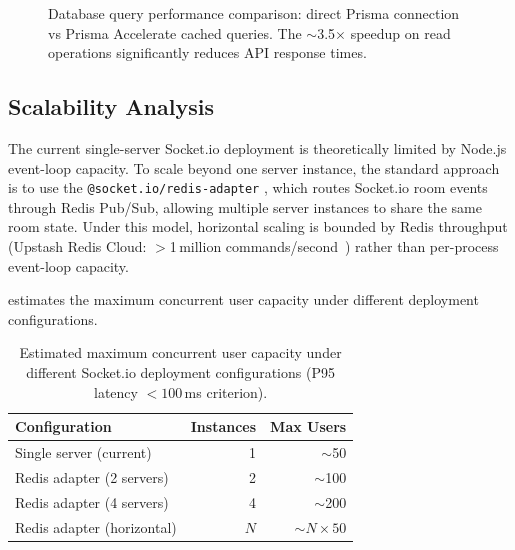 \begin{figure}[H]
  \centering
  \caption{Database query performance comparison: direct Prisma connection
    vs Prisma Accelerate cached queries. The $\sim$3.5$\times$ speedup
    on read operations significantly reduces API response times.}
  \label{fig:db_queries}
\end{figure}

\subsection{Scalability Analysis}

The current single-server Socket.io deployment is theoretically limited by
Node.js event-loop capacity. To scale beyond one server instance, the standard
approach is to use the \texttt{@socket.io/redis-adapter}
\cite{socketio2024adapter}, which routes Socket.io room events through Redis
Pub/Sub, allowing multiple server instances to share the same room state.
Under this model, horizontal scaling is bounded by Redis throughput
(Upstash Redis Cloud: $>$1\,million commands/second~\cite{upstash2024}) rather
than per-process event-loop capacity.

 estimates the maximum concurrent user capacity under
different deployment configurations.

\begin{table}[H]
  \centering
  \caption{Estimated maximum concurrent user capacity under different
    Socket.io deployment configurations (P95 latency $< 100$\,ms criterion).}
  \label{tab:scalability}
  \begin{tabular}{lrr}
    \toprule
    \textbf{Configuration}          & \textbf{Instances} & \textbf{Max Users} \\
    \midrule
    Single server (current)         & 1                  & $\sim$50 \\
    Redis adapter (2 servers)       & 2                  & $\sim$100 \\
    Redis adapter (4 servers)       & 4                  & $\sim$200 \\
    Redis adapter (horizontal)      & $N$                & $\sim$$N \times 50$ \\
    \bottomrule
  \end{tabular}
\end{table}

